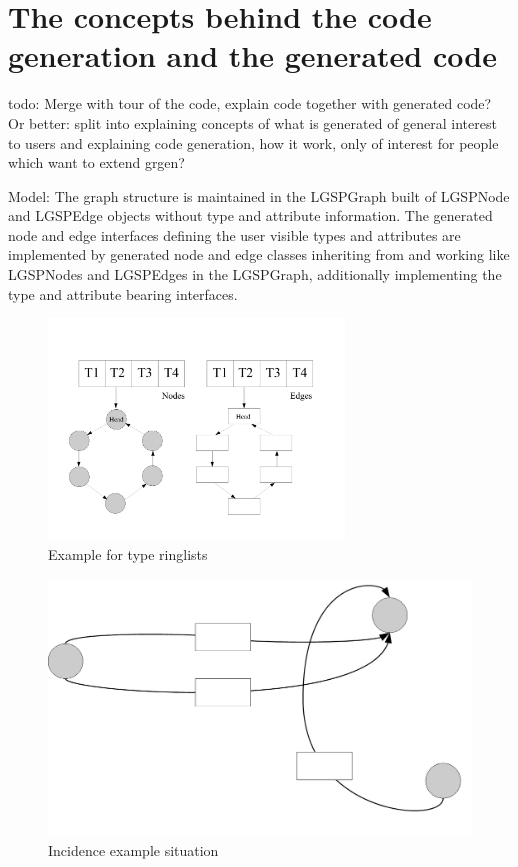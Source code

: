 \section{The concepts behind the code generation and the generated code}
todo: Merge with tour of the code, explain code together with generated code?
Or better: split into explaining concepts of what is generated of general interest to users
and explaining code generation, how it work, only of interest for people which want to extend grgen?

Model:
The graph structure is maintained in the LGSPGraph built of LGSPNode and LGSPEdge objects without type and attribute information. The generated node and edge interfaces defining the user visible types and attributes are implemented by generated node and edge classes inheriting from and working like LGSPNodes and LGSPEdges in the LGSPGraph, additionally implementing the type and attribute bearing interfaces.

\begin{figure}[htbp]
  \centering
  \includegraphics[width=0.7\textwidth]{fig/TypeRinglists}
  \caption{Example for type ringlists}
  \label{figtyperinglists}
\end{figure}

\begin{figure}[htbp]
  \centering
  \includegraphics[width=\textwidth]{fig/IncidenceExample}
  \caption{Incidence example situation}
  \label{figincidenceexample}
\end{figure}

